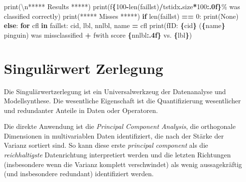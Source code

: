 \documentclass[
]{book}
\newenvironment{Shaded}{\begin{snugshade}}{\end{snugshade}}
\newcommand{\BuiltInTok}[1]{#1}
\newcommand{\CharTok}[1]{\textcolor[rgb]{0.31,0.60,0.02}{#1}}
\newcommand{\ControlFlowTok}[1]{\textcolor[rgb]{0.13,0.29,0.53}{\textbf{#1}}}
\newcommand{\DecValTok}[1]{\textcolor[rgb]{0.00,0.00,0.81}{#1}}
\newcommand{\KeywordTok}[1]{\textcolor[rgb]{0.13,0.29,0.53}{\textbf{#1}}}
\newcommand{\NormalTok}[1]{#1}
\newcommand{\OperatorTok}[1]{\textcolor[rgb]{0.81,0.36,0.00}{\textbf{#1}}}
\newcommand{\SpecialCharTok}[1]{\textcolor[rgb]{0.81,0.36,0.00}{\textbf{#1}}}
\newcommand{\SpecialStringTok}[1]{\textcolor[rgb]{0.31,0.60,0.02}{#1}}
\newcommand{\StringTok}[1]{\textcolor[rgb]{0.31,0.60,0.02}{#1}}
\theoremstyle{definition}
\theoremstyle{definition}
\theoremstyle{definition}
\theoremstyle{definition}
\theoremstyle{remark}
\begin{document}
\begin{Shaded}
\begin{Highlighting}[]
\BuiltInTok{print}\NormalTok{(}\StringTok{\textquotesingle{}}\CharTok{\textbackslash{}n}\StringTok{***** Results *****\textquotesingle{}}\NormalTok{)}
\BuiltInTok{print}\NormalTok{(}\SpecialStringTok{f\textquotesingle{}}\SpecialCharTok{\{}\DecValTok{100}\OperatorTok{{-}}\BuiltInTok{len}\NormalTok{(faillst)}\OperatorTok{/}\NormalTok{tstidx}\SpecialCharTok{.}\NormalTok{size}\OperatorTok{*}\DecValTok{100}\SpecialCharTok{:.0f\}}\SpecialStringTok{\% was classified correctly\textquotesingle{}}\NormalTok{)}
\BuiltInTok{print}\NormalTok{(}\StringTok{\textquotesingle{}***** Misses *****\textquotesingle{}}\NormalTok{)}
\ControlFlowTok{if} \BuiltInTok{len}\NormalTok{(faillst) }\OperatorTok{==} \DecValTok{0}\NormalTok{:}
    \BuiltInTok{print}\NormalTok{(}\StringTok{\textquotesingle{}None\textquotesingle{}}\NormalTok{)}
\ControlFlowTok{else}\NormalTok{:}
    \ControlFlowTok{for}\NormalTok{ cfl }\KeywordTok{in}\NormalTok{ faillst:}
\NormalTok{        cid, lbl, nnlbl, name }\OperatorTok{=}\NormalTok{ cfl}
        \BuiltInTok{print}\NormalTok{(}\SpecialStringTok{f\textquotesingle{}ID: }\SpecialCharTok{\{}\NormalTok{cid}\SpecialCharTok{\}}\SpecialStringTok{ (}\SpecialCharTok{\{}\NormalTok{name}\SpecialCharTok{\}}\SpecialStringTok{ pinguin) was missclassified \textquotesingle{}} \OperatorTok{+}
              \SpecialStringTok{f\textquotesingle{}with score }\SpecialCharTok{\{}\NormalTok{nnlbl}\SpecialCharTok{:.4f\}}\SpecialStringTok{ vs. }\SpecialCharTok{\{}\NormalTok{lbl}\SpecialCharTok{\}}\SpecialStringTok{\textquotesingle{}}\NormalTok{)}
\end{Highlighting}
\end{Shaded}

\hypertarget{singuluxe4rwert-zerlegung}{%
\chapter{Singulärwert Zerlegung}\label{singuluxe4rwert-zerlegung}}

Die Singulärwertzerlegung ist ein Universalwerkzeug der Datenanalyse und
Modellsynthese.
Die wesentliche Eigenschaft ist die Quantifizierung
wesentlicher und redundanter Anteile in Daten oder Operatoren.

Die direkte Anwendung ist die \emph{Principal Component Analysis}, die orthogonale Dimensionen in multivariablen Daten identifiziert, die nach der Stärke der Varianz sortiert sind. So kann diese erste \emph{principal component} als die \emph{reichhaltigste} Datenrichtung interpretiert werden und die letzten Richtungen (insbesondere wenn die Varianz komplett verschwindet) als wenig aussagekräftig (und insbesondere redundant) identifiziert werden.
\end{document}
